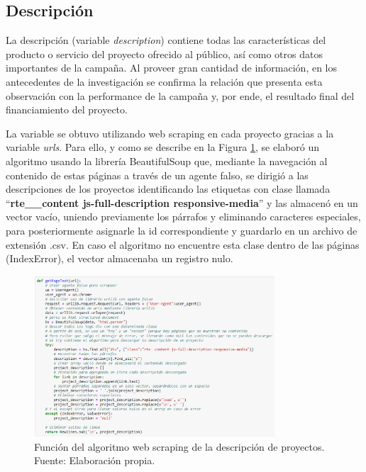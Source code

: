 \subsection{Descripción}
La descripción (variable \textit{description}) contiene todas las características del producto o servicio del proyecto ofrecido al público, así como otros datos importantes de la campaña. Al proveer gran cantidad de información, en los antecedentes de la investigación se confirma la relación que presenta esta observación con la performance de la campaña y, por ende, el resultado final del financiamiento del proyecto.

La variable se obtuvo utilizando web scraping en cada proyecto gracias a la variable \textit{urls}. Para ello, y como se describe en la Figura \ref{4:fig6}, se elaboró un algoritmo usando la librería BeautifulSoup que, mediante la navegación al contenido de estas páginas a través de un agente falso, se dirigió a las descripciones de los proyectos identificando las etiquetas con clase llamada “\textbf{rte\_\_content js-full-description responsive-media}” y las almacenó en un vector vacío, uniendo previamente los párrafos y eliminando caracteres especiales, para posteriormente asignarle la id correspondiente y guardarlo en un archivo de extensión .csv. En caso el algoritmo no encuentre esta clase dentro de las páginas (IndexError), el vector almacenaba un registro nulo.

\begin{figure}[!ht]
	\begin{center}
		\includegraphics[width=0.8\textwidth]{4/figures/description_scraping.png}
		\caption{Función del algoritmo web scraping de la descripción de proyectos. Fuente: Elaboración propia.}
		\label{4:fig6}
	\end{center}
\end{figure}

